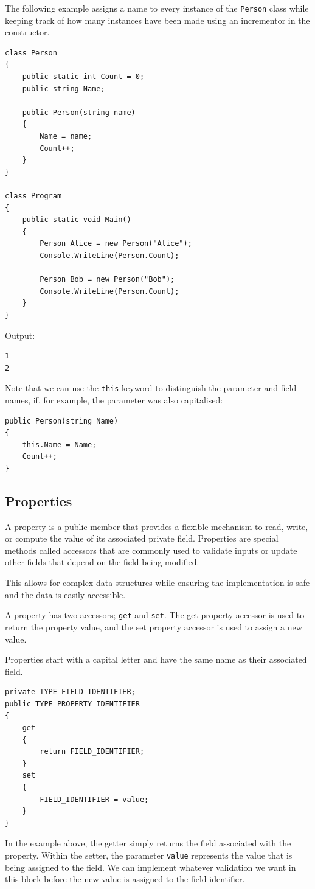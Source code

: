 \documentclass{article}
\begin{document}
The following example assigns a name to every instance of the \lstinline{Person} class while keeping track of
how many instances have been made using an incrementor in the constructor.
\begin{lstlisting}
class Person
{
    public static int Count = 0;
    public string Name;

    public Person(string name)
    {
        Name = name;
        Count++;
    }
}

class Program
{
    public static void Main()
    {
        Person Alice = new Person("Alice");
        Console.WriteLine(Person.Count);

        Person Bob = new Person("Bob");
        Console.WriteLine(Person.Count);
    }
}
\end{lstlisting}
Output:
\begin{lstlisting}[numbers=none]
1
2
\end{lstlisting}
Note that we can use the \lstinline{this} keyword
to distinguish the parameter and field names, if, for example, the parameter was also capitalised:
\begin{lstlisting}
public Person(string Name)
{
    this.Name = Name;
    Count++;
}
\end{lstlisting}
\subsection{Properties}
A property is a public member that provides a flexible mechanism to read, write,
or compute the value of its associated private field. Properties are special methods called accessors that are commonly used to validate inputs
or update other fields that depend on the field being modified.

This allows for complex data structures while ensuring the implementation is safe and
the data is easily accessible.

A property has two accessors; \lstinline{get} and \lstinline{set}. The get property accessor is used to
return the property value, and the set property accessor is used to assign a new value.

Properties start with a capital letter and have the same name as their associated field.
\begin{lstlisting}[numbers=none]
private TYPE FIELD_IDENTIFIER;
public TYPE PROPERTY_IDENTIFIER 
{
    get
    {
        return FIELD_IDENTIFIER;
    }
    set
    {
        FIELD_IDENTIFIER = value;
    }
}
\end{lstlisting}
In the example above, the getter simply returns the field associated with the property.
Within the setter, the parameter \lstinline{value} represents the value that is being
assigned to the field. We can implement whatever validation we want in this block before the new value is assigned to
the field identifier.
\end{document}

